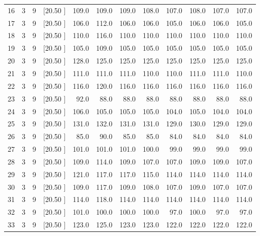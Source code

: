 \documentclass[12pt,a4paper]{article}
\begin{document}
\begin{center}
{\begin{tabular}{r r r r r r r r r r r r}
  16&  3&  9&[20.50     ]&   109.0&   109.0&   109.0&   108.0&   107.0&   108.0&   107.0&   107.0\\[-0.02in]
  17&  3&  9&[20.50     ]&   106.0&   112.0&   106.0&   106.0&   105.0&   106.0&   106.0&   105.0\\[-0.02in]
  18&  3&  9&[20.50     ]&   110.0&   116.0&   110.0&   110.0&   110.0&   110.0&   110.0&   110.0\\[-0.02in]
  19&  3&  9&[20.50     ]&   105.0&   109.0&   105.0&   105.0&   105.0&   105.0&   105.0&   105.0\\[-0.02in]
  20&  3&  9&[20.50     ]&   128.0&   125.0&   125.0&   125.0&   125.0&   125.0&   125.0&   125.0\\[-0.02in]
  21&  3&  9&[20.50     ]&   111.0&   111.0&   111.0&   110.0&   110.0&   111.0&   111.0&   110.0\\[-0.02in]
  22&  3&  9&[20.50     ]&   116.0&   120.0&   116.0&   116.0&   116.0&   116.0&   116.0&   116.0\\[-0.02in]
  23&  3&  9&[20.50     ]&    92.0&    88.0&    88.0&    88.0&    88.0&    88.0&    88.0&    88.0\\[-0.02in]
  24&  3&  9&[20.50     ]&   106.0&   105.0&   105.0&   105.0&   104.0&   105.0&   104.0&   104.0\\[-0.02in]
  25&  3&  9&[20.50     ]&   131.0&   132.0&   131.0&   131.0&   129.0&   130.0&   129.0&   129.0\\[-0.02in]
  26&  3&  9&[20.50     ]&    85.0&    90.0&    85.0&    85.0&    84.0&    84.0&    84.0&    84.0\\[-0.02in]
  27&  3&  9&[20.50     ]&   101.0&   101.0&   101.0&   100.0&    99.0&    99.0&    99.0&    99.0\\[-0.02in]
  28&  3&  9&[20.50     ]&   109.0&   114.0&   109.0&   107.0&   107.0&   109.0&   109.0&   107.0\\[-0.02in]
  29&  3&  9&[20.50     ]&   121.0&   117.0&   117.0&   115.0&   114.0&   114.0&   114.0&   114.0\\[-0.02in]
  30&  3&  9&[20.50     ]&   109.0&   117.0&   109.0&   108.0&   107.0&   109.0&   107.0&   107.0\\[-0.02in]
  31&  3&  9&[20.50     ]&   114.0&   118.0&   114.0&   114.0&   114.0&   114.0&   114.0&   114.0\\[-0.02in]
  32&  3&  9&[20.50     ]&   101.0&   100.0&   100.0&   100.0&    97.0&   100.0&    97.0&    97.0\\[-0.02in]
  33&  3&  9&[20.50     ]&   123.0&   125.0&   123.0&   123.0&   122.0&   122.0&   122.0&   122.0\\[-0.02in]

\end{tabular}}
\end{center}
\end{document}
